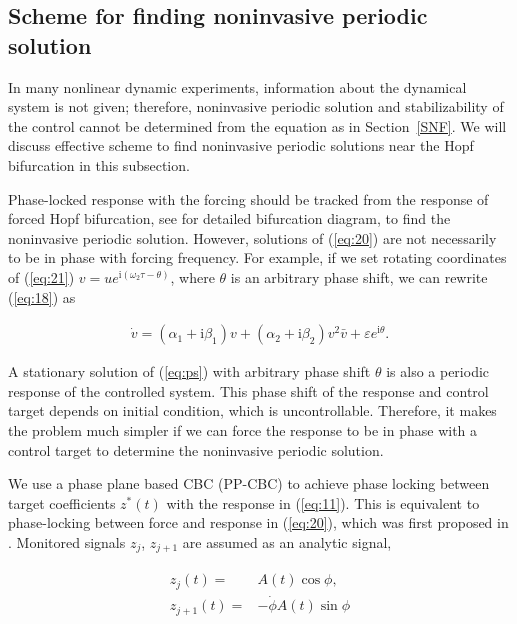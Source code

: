 \documentclass[openacc]{rsproca_new}%
\def\epsilon{\varepsilon}
\newcommand{\Eref}[1]{(\ref{#1})}
\newcommand{\Sref}[1]{Section~\ref{#1}}
\begin{document}
\subsection{Scheme for finding noninvasive periodic solution}\label{FNP}

In many nonlinear dynamic experiments, information about the dynamical system is not given; therefore, noninvasive periodic solution and stabilizability of the control cannot be determined from the equation as in \Sref{SNF}. We will discuss effective scheme to find noninvasive periodic solutions near the Hopf bifurcation in this subsection.

Phase-locked response with the forcing should be tracked from the response of forced Hopf bifurcation, see \cite{zhang2011periodically,wiser2015bifurcations} for detailed bifurcation diagram, to find the noninvasive periodic solution. However, solutions of \Eref{eq:20} are not necessarily to be in phase with forcing frequency. For example, if we set rotating coordinates of \Eref{eq:21} $v=ue^{\textrm{i}(\omega_2 \tau-\theta)}$, where $\theta$ is an arbitrary phase shift, we can rewrite \Eref{eq:18}
as

\begin{align}\label{eq:ps}
\dot v=(\alpha_1+\textrm{i}\beta_1)v+(\alpha_2+\textrm{i}\beta_2)v^2 \bar v+\epsilon e^{\textrm{i}\theta}.
\end{align}

\noindent A stationary solution of \Eref{eq:ps} with arbitrary phase shift $\theta$ is also a periodic response of the controlled system. This phase shift of the response and control target depends on initial condition, which is uncontrollable. Therefore, it makes the problem much simpler if we can force the response to be in phase with a control target to determine the noninvasive periodic solution.

We use a phase plane based CBC (PP-CBC) to achieve phase locking between target coefficients $z^*(t)$ with the response in \Eref{eq:11}. This is equivalent to phase-locking between force and response in \Eref{eq:20}, which was first proposed in \cite{irene}. Monitored signals $z_j$, $z_{j+1}$  are assumed as an analytic signal,

\begin{align}\label{eq:25}
\begin{split}
z_{j}(t)=&A(t)\cos{\phi},\\
z_{j+1}(t)=&-\dot\phi A(t)\sin{\phi}
\end{split}
\end{align}
\end{document}
